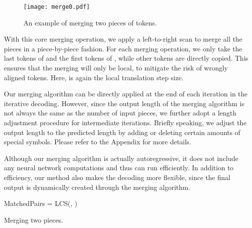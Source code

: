 \documentclass[11pt,a4paper]{article}
\begin{document}
\begin{figure}[t]
	\centering
	\texttt{[image: merge0.pdf]}
	\caption{An example of merging two pieces of tokens.}
	\label{fig:merge0}
\end{figure}

With this core merging operation, we apply a left-to-right scan to merge all the pieces in a piece-by-piece fashion. For each merging operation, we only take the last  tokens of  and the first  tokens of , while other tokens are directly copied. This ensures that the merging will only be local, to mitigate the risk of wrongly aligned tokens. Here,  is again the local translation step size.

Our merging algorithm can be directly applied at the end of each iteration in the iterative decoding. However, since the output length of the merging algorithm is not always the same as the number of input pieces, we further adopt a length adjustment procedure for intermediate iterations. Briefly speaking, we adjust the output length to the predicted length by adding or deleting certain amounts of special  symbols. Please refer to the Appendix for more details.

Although our merging algorithm is actually autoregressive, it does not include any neural network computations and thus can run efficiently. 
In addition to efficiency, our method also makes the decoding more flexible, since the final output is dynamically created through the merging algorithm.

\begin{algorithm}[t]
    \small
	MatchedPairs = LCS(, )\;
	\caption{Merging two pieces.}
	\label{alg:merge}
\end{algorithm}
\end{document}
